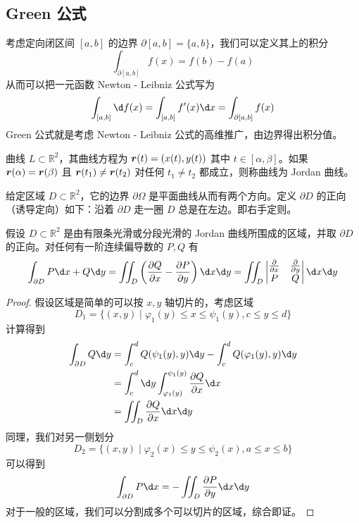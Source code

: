 \subsection{Green 公式}

考虑定向闭区间 $[a, b]$ 的边界 $\partial[a, b] = \{a, b\}$，我们可以定义其上的积分
\[ \int_{\partial[a, b]} f(x) = f(b) - f(a) \]
从而可以把一元函数 Newton - Leibniz 公式写为
\[ \int_{[a,b]} \d f(x) = \int_{[a, b]} f'(x) \d x = \int_{\partial [a, b]} f(x) \]
Green 公式就是考虑 Newton - Leibniz 公式的高维推广，由边界得出积分值。

曲线 $L \subset \mathbb{R}^2$，其曲线方程为 $\boldsymbol{r}(t) = (x(t), y(t))$ 其中 $t \in [\alpha, \beta]$。如果 $\boldsymbol{r}(\alpha) = \boldsymbol{r}(\beta)$ 且 $\boldsymbol{r}(t_1) \neq \boldsymbol{r}(t_2)$ 对任何 $t_1 \neq t_2$ 都成立，则称曲线为 Jordan 曲线。

给定区域 $D \subset \mathbb{R}^2$，它的边界 $\partial \Omega$ 是平面曲线从而有两个方向。定义 $\partial D$ 的正向（诱导定向）如下：沿着 $\partial D$ 走一圈 $D$ 总是在左边。即右手定则。

\begin{theorem}[Green 公式]
	假设 $D \subset \mathbb{R}^2$ 是由有限条光滑或分段光滑的 Jordan 曲线所围成的区域，并取 $\partial D$ 的正向。对任何有一阶连续偏导数的 $P, Q$ 有
	\[ \int_{\partial D} P \d x + Q \d y = \iint_{D} \left( \frac{\partial Q}{\partial x} - \frac{\partial P}{\partial y} \right) \d x \d y = \iint_{D} \left| \begin{matrix}
			\frac{\partial}{\partial x} & \frac{\partial}{\partial y} \\
			P                           & Q
		\end{matrix} \right| \d x \d y \]
\end{theorem}

\begin{proof}
	假设区域是简单的可以按 $x,y$ 轴切片的，考虑区域
	\[ D_1 = \{ (x, y) \mid \varphi_1(y) \leqslant x \leqslant \psi_1 (y), c \leqslant y \leqslant d \} \]
	计算得到
	\[ \begin{aligned}
			\int_{\partial D} Q \d y & = \int_{c}^d Q(\psi_1(y), y) \d y - \int_c^d Q(\varphi_1(y), y) \d y               \\
			                         & = \int_c^d \d y \int_{\varphi_1(y)}^{\psi_1(y)} \frac{\partial Q}{\partial x} \d x \\
			                         & = \iint_{D} \frac{\partial Q}{\partial x} \d x \d y
		\end{aligned} \]
	同理，我们对另一侧划分
	\[ D_2 = \{ (x, y) \mid \varphi_2(x) \leqslant y \leqslant \psi_2 (x), a \leqslant x \leqslant b \} \]
	可以得到
	\[ \int_{\partial D} P \d x = -\iint_{D} \frac{\partial P}{\partial y} \d x \d y \]
	对于一般的区域，我们可以分割成多个可以切片的区域，综合即证。
\end{proof}

